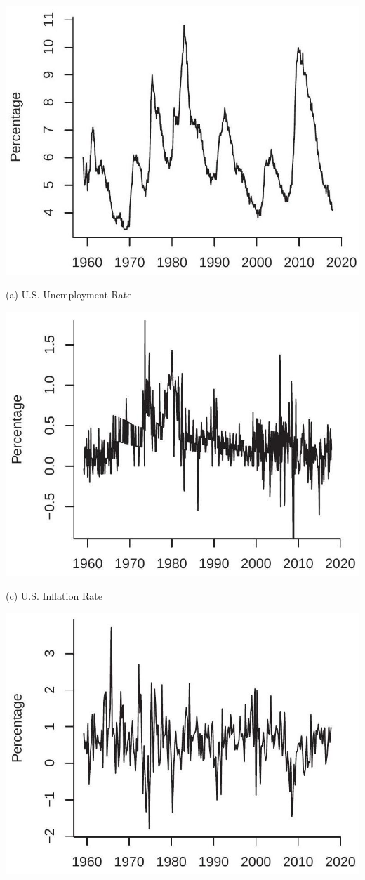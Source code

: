\documentclass[10pt]{article}
\begin{document}
\includegraphics[max width=\textwidth]{2022_10_23_6047885e7d154c9f28afg-03}

(a) U.S. Unemployment Rate

\includegraphics[max width=\textwidth]{2022_10_23_6047885e7d154c9f28afg-03(1)}

(c) U.S. Inflation Rate

\includegraphics[max width=\textwidth]{2022_10_23_6047885e7d154c9f28afg-03(2)}
\end{document}
